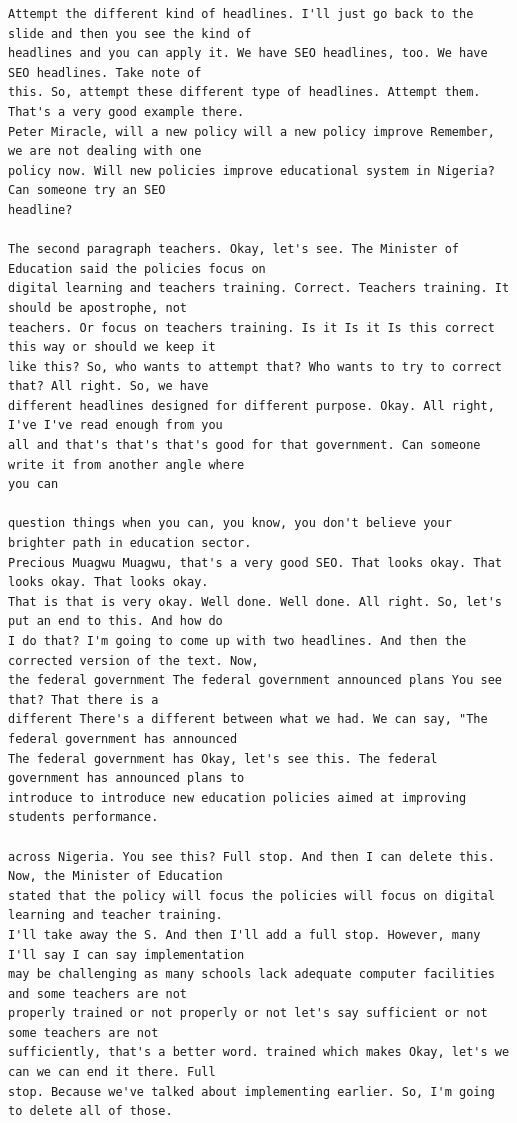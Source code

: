 {\begin{Verbatim}
Attempt the different kind of headlines. I'll just go back to the slide and then you see the kind of
headlines and you can apply it. We have SEO headlines, too. We have SEO headlines. Take note of
this. So, attempt these different type of headlines. Attempt them. That's a very good example there.
Peter Miracle, will a new policy will a new policy improve Remember, we are not dealing with one
policy now. Will new policies improve educational system in Nigeria? Can someone try an SEO
headline?

The second paragraph teachers. Okay, let's see. The Minister of Education said the policies focus on
digital learning and teachers training. Correct. Teachers training. It should be apostrophe, not
teachers. Or focus on teachers training. Is it Is it Is this correct this way or should we keep it
like this? So, who wants to attempt that? Who wants to try to correct that? All right. So, we have
different headlines designed for different purpose. Okay. All right, I've I've read enough from you
all and that's that's that's good for that government. Can someone write it from another angle where
you can

question things when you can, you know, you don't believe your brighter path in education sector.
Precious Muagwu Muagwu, that's a very good SEO. That looks okay. That looks okay. That looks okay.
That is that is very okay. Well done. Well done. All right. So, let's put an end to this. And how do
I do that? I'm going to come up with two headlines. And then the corrected version of the text. Now,
the federal government The federal government announced plans You see that? That there is a
different There's a different between what we had. We can say, "The federal government has announced
The federal government has Okay, let's see this. The federal government has announced plans to
introduce to introduce new education policies aimed at improving students performance.

across Nigeria. You see this? Full stop. And then I can delete this. Now, the Minister of Education
stated that the policy will focus the policies will focus on digital learning and teacher training.
I'll take away the S. And then I'll add a full stop. However, many I'll say I can say implementation
may be challenging as many schools lack adequate computer facilities and some teachers are not
properly trained or not properly or not let's say sufficient or not some teachers are not
sufficiently, that's a better word. trained which makes Okay, let's we can we can end it there. Full
stop. Because we've talked about implementing earlier. So, I'm going to delete all of those.


\end{Verbatim}}
